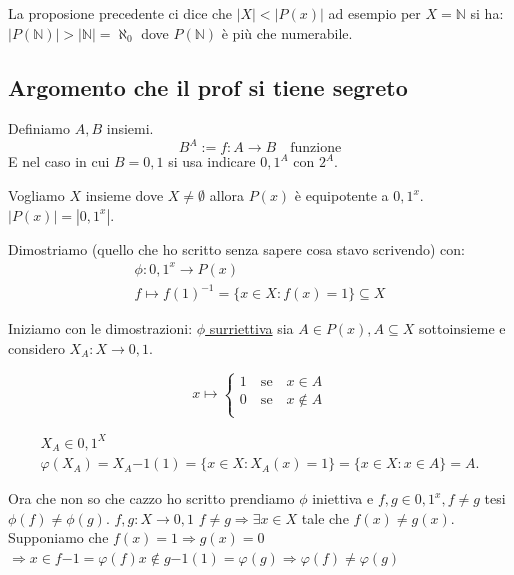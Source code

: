 \documentclass{article}
\theoremstyle{definition}
\begin{document}
La proposione precedente ci dice che $|X| < |P(x)|$ ad esempio per $X = \mathbb{N}$ si ha: \newline
$|P(\mathbb{N})| > |\mathbb{N}| = \aleph_0 $ dove $P(\mathbb{N})$ è più che numerabile.


\subsection{Argomento che il prof si tiene segreto}
Definiamo $A,B$ insiemi.
\begin{equation}
        B^A := {f:A \to B \quad \mbox{funzione}}
\end{equation}
E nel caso in cui $B = {0,1}$ si usa indicare ${0,1}^A$ con $2^A$.


Vogliamo $X$ insieme dove $X \not = \emptyset$ allora $P(x)$ è equipotente a ${0,1}^x$. \newline
$|P(x)| = |{0,1}^x|$.

Dimostriamo (quello che ho scritto senza sapere cosa stavo scrivendo) con:
\begin{align*}
        \phi : {0,1}^x \to P(x) \\
        f \mapsto {f(1)}^{-1} = \{x \in X : f(x) = 1\} \subseteq X
\end{align*}

Iniziamo con le dimostrazioni:
\underline{$\phi$ surriettiva} sia $A \in P(x), A \subseteq X$ sottoinsieme e considero $X_A : X \to {0,1}$.


\[x \mapsto  
\begin{cases}
        1 \quad \mbox{se} \quad x \in A \\
        0 \quad \mbox{se} \quad x \not \in A \\
\end{cases}
\]

\begin{align*}
X_A \in {0,1}^X \\
\varphi(X_A) = {X_A}{-1}(1) = \{x \in X : X_A(x) = 1\} = \{x \in X : x \in A\} = A.
\end{align*}

Ora che non so che cazzo ho scritto prendiamo $\phi$ iniettiva e $f,g \in {0,1}^x, f \not = g$ tesi $\phi(f) \not = \phi(g)$.
$f,g : X \to {0,1}$ \newline
$f \not = g \Rightarrow \exists x \in X$ tale che $f(x) \not = g(x)$.
Supponiamo che $f(x) = 1 \Rightarrow g(x) = 0$ \newline
$\Rightarrow x \in {f}{-1} = \varphi(f) x \not \in {g}{-1}(1) = \varphi(g) \Rightarrow \varphi(f) \not = \varphi(g)$
\end{document}

